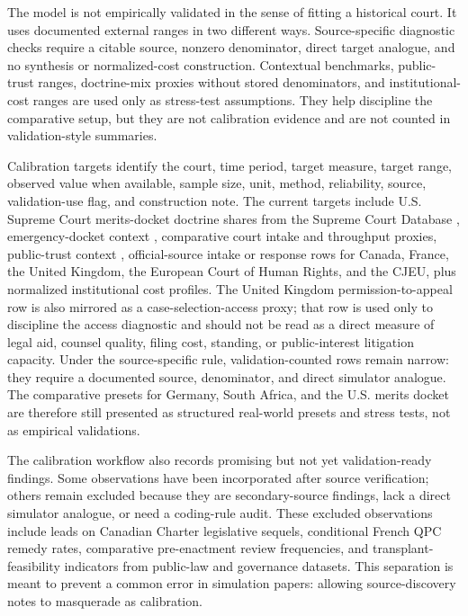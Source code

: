 \documentclass[
  journal=small,
  manuscript=research-article,
  year=2026
]{cup-journal}
\begin{document}
The model is not empirically validated in the sense of fitting a historical court. It uses documented external ranges in two different ways. Source-specific diagnostic checks require a citable source, nonzero denominator, direct target analogue, and no synthesis or normalized-cost construction. Contextual benchmarks, public-trust ranges, doctrine-mix proxies without stored denominators, and institutional-cost ranges are used only as stress-test assumptions. They help discipline the comparative setup, but they are not calibration evidence and are not counted in validation-style summaries.

Calibration targets identify the court, time period, target measure, target range, observed value when available, sample size, unit, method, reliability, source, validation-use flag, and construction note. The current targets include U.S. Supreme Court merits-docket doctrine shares from the Supreme Court Database \citep{scdb2025,scdbIssueCodebook}, emergency-docket context \citep{scotusblogInterim2024}, comparative court intake and throughput proxies, public-trust context \citep{gallupCourtApproval2024}, official-source intake or response rows for Canada, France, the United Kingdom, the European Court of Human Rights, and the CJEU, plus normalized institutional cost profiles. The United Kingdom permission-to-appeal row is also mirrored as a case-selection-access proxy; that row is used only to discipline the access diagnostic and should not be read as a direct measure of legal aid, counsel quality, filing cost, standing, or public-interest litigation capacity. Under the source-specific rule, validation-counted rows remain narrow: they require a documented source, denominator, and direct simulator analogue. The comparative presets for Germany, South Africa, and the U.S. merits docket are therefore still presented as structured real-world presets and stress tests, not as empirical validations.

The calibration workflow also records promising but not yet validation-ready findings. Some observations have been incorporated after source verification; others remain excluded because they are secondary-source findings, lack a direct simulator analogue, or need a coding-rule audit. These excluded observations include leads on Canadian Charter legislative sequels, conditional French QPC remedy rates, comparative pre-enactment review frequencies, and transplant-feasibility indicators from public-law and governance datasets. This separation is meant to prevent a common error in simulation papers: allowing source-discovery notes to masquerade as calibration.
\end{document}
